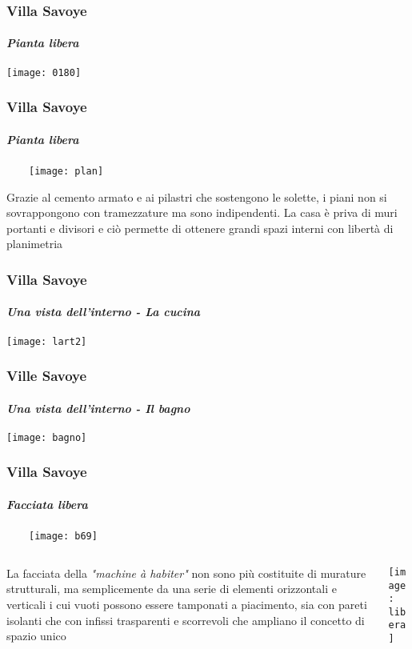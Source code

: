 \documentclass{beamer}
\begin{document}
\begin{frame}
\frametitle{Villa Savoye}
\framesubtitle{\textit{Pianta libera}}

\texttt{[image: 0180]}

\end{frame}

\begin{frame}

\frametitle{Villa Savoye}
\framesubtitle{\textit{Pianta libera}}

~~~~\texttt{[image: plan]}

Grazie al cemento armato e ai pilastri che sostengono le solette, i  piani non si sovrappongono con tramezzature ma sono indipendenti. La casa è priva di muri portanti e divisori e ciò permette di ottenere grandi spazi interni con libertà di planimetria 

\end{frame}

\begin{frame}
\frametitle{Villa Savoye}
\framesubtitle{\textit{Una vista dell'interno - La cucina}}

\texttt{[image: lart2]}

\end{frame}


\begin{frame}
\frametitle{Ville Savoye}
\framesubtitle{\textit{Una vista dell'interno - Il bagno}}

\texttt{[image: bagno]}
\end{frame}

\usebackgroundtemplate{}

\begin{frame}
\frametitle{Villa Savoye}
\framesubtitle{\textit{Facciata libera}}

~~~~\texttt{[image: b69]}

\begin{columns}
\begin{column}{0.6\textwidth}

La facciata della \emph{"machine à habiter"} non sono più costituite di murature strutturali, ma semplicemente da una serie di elementi orizzontali e verticali i cui vuoti possono essere tamponati a piacimento, sia con pareti isolanti che con infissi trasparenti e scorrevoli che ampliano il concetto di spazio unico
 
\end{column}

\begin{column}{0.4\textwidth} 
\texttt{[image: libera]}

\end{column}
\end{columns}

\end{frame}
\end{document}
